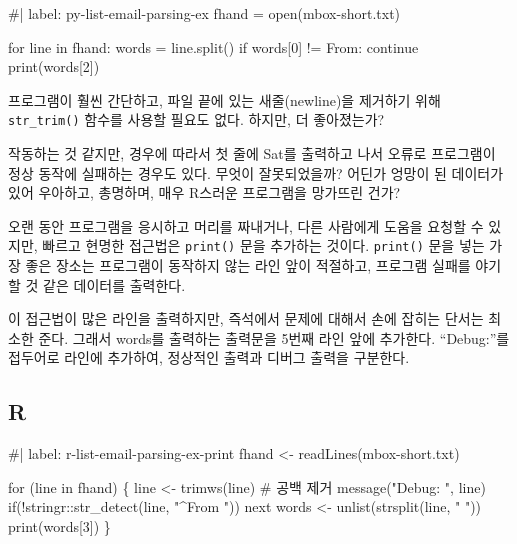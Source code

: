 \documentclass[
  letterpaper,
]{book}
\newenvironment{Shaded}{\begin{snugshade}}{\end{snugshade}}
\newcommand{\NormalTok}[1]{\textcolor[rgb]{0.00,0.23,0.31}{#1}}
\begin{document}
\begin{Shaded}
\begin{Highlighting}[]
\NormalTok{\#| label: py{-}list{-}email{-}parsing{-}ex}
\NormalTok{fhand = open(\textquotesingle{}mbox{-}short.txt\textquotesingle{})}

\NormalTok{for line in fhand:}
\NormalTok{    words = line.split()}
\NormalTok{    if words[0] != \textquotesingle{}From\textquotesingle{}: }
\NormalTok{        continue}
\NormalTok{    print(words[2])}
\end{Highlighting}
\end{Shaded}

프로그램이 훨씬 간단하고, 파일 끝에 있는 새줄(newline)을 제거하기 위해
\texttt{str\_trim()} 함수를 사용할 필요도 없다. 하지만, 더 좋아졌는가?

작동하는 것 같지만, 경우에 따라서 첫 줄에 Sat를 출력하고 나서 오류로
프로그램이 정상 동작에 실패하는 경우도 있다. 무엇이 잘못되었을까? 어딘가
엉망이 된 데이터가 있어 우아하고, 총명하며, 매우 R스러운 프로그램을
망가뜨린 건가?

오랜 동안 프로그램을 응시하고 머리를 짜내거나, 다른 사람에게 도움을
요청할 수 있지만, 빠르고 현명한 접근법은 \texttt{print()} 문을 추가하는
것이다. \texttt{print()} 문을 넣는 가장 좋은 장소는 프로그램이 동작하지
않는 라인 앞이 적절하고, 프로그램 실패를 야기할 것 같은 데이터를
출력한다.

이 접근법이 많은 라인을 출력하지만, 즉석에서 문제에 대해서 손에 잡히는
단서는 최소한 준다. 그래서 words를 출력하는 출력문을 5번째 라인 앞에
추가한다. ``Debug:''를 접두어로 라인에 추가하여, 정상적인 출력과 디버그
출력을 구분한다.

\subsection{R}

\begin{Shaded}
\begin{Highlighting}[]
\NormalTok{\#| label: r{-}list{-}email{-}parsing{-}ex{-}print}
\NormalTok{fhand \textless{}{-} readLines(\textquotesingle{}mbox{-}short.txt\textquotesingle{})}

\NormalTok{for (line in fhand) \{}
\NormalTok{    line \textless{}{-} trimws(line)  \# 공백 제거}
\NormalTok{    message("Debug: ", line)}
\NormalTok{    if(!stringr::str\_detect(line, "\^{}From ")) next}
\NormalTok{    words \textless{}{-} unlist(strsplit(line, " "))}
\NormalTok{    print(words[3])}
\NormalTok{\}}
\end{Highlighting}
\end{Shaded}
\end{document}

